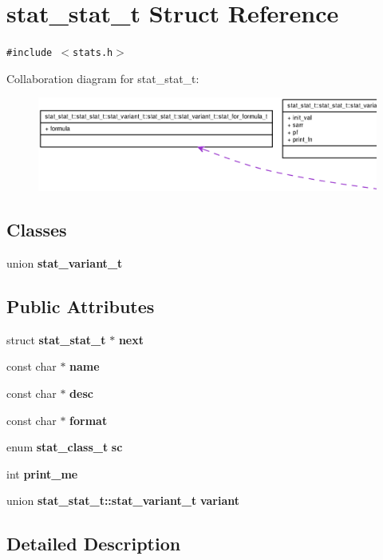 \section{stat\_\-stat\_\-t Struct Reference}
\label{structstat__stat__t}
{\tt \#include $<$stats.h$>$}

Collaboration diagram for stat\_\-stat\_\-t:\nopagebreak
\begin{figure}[H]
\begin{center}
\leavevmode
\includegraphics[width=400pt]{structstat__stat__t__coll__graph}
\end{center}
\end{figure}
\subsection*{Classes}
\begin{CompactItemize}
\item 
union {\bf stat\_\-variant\_\-t}
\end{CompactItemize}
\subsection*{Public Attributes}
\begin{CompactItemize}
\item 
struct {\bf stat\_\-stat\_\-t} $\ast$ {\bf next}
\item 
const char $\ast$ {\bf name}
\item 
const char $\ast$ {\bf desc}
\item 
const char $\ast$ {\bf format}
\item 
enum {\bf stat\_\-class\_\-t} {\bf sc}
\item 
int {\bf print\_\-me}
\item 
union {\bf stat\_\-stat\_\-t::stat\_\-variant\_\-t} {\bf variant}
\end{CompactItemize}


\subsection{Detailed Description}


